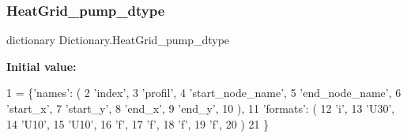 \mbox{\label{namespace_dictionary_a616d65efc5bb5f169c0fb9781b4292c2}} 
\subsubsection{\texorpdfstring{Heat\+Grid\+\_\+pump\+\_\+dtype}{HeatGrid\_pump\_dtype}}
{\footnotesize\ttfamily dictionary Dictionary.\+Heat\+Grid\+\_\+pump\+\_\+dtype}

{\bfseries Initial value\+:}
\begin{DoxyCode}
1 =     \{\textcolor{stringliteral}{'names'}: (
2                                 \textcolor{stringliteral}{'index'},
3                                 \textcolor{stringliteral}{'profil'},
4                                 \textcolor{stringliteral}{'start\_node\_name'},
5                                 \textcolor{stringliteral}{'end\_node\_name'},
6                                 \textcolor{stringliteral}{'start\_x'},
7                                 \textcolor{stringliteral}{'start\_y'},
8                                 \textcolor{stringliteral}{'end\_x'},
9                                 \textcolor{stringliteral}{'end\_y'},
10                                 ),
11                        \textcolor{stringliteral}{'formats'}: (
12                                 \textcolor{stringliteral}{'i'},
13                                 \textcolor{stringliteral}{'U30'},
14                                 \textcolor{stringliteral}{'U10'},
15                                 \textcolor{stringliteral}{'U10'},
16                                 \textcolor{stringliteral}{'f'},
17                                 \textcolor{stringliteral}{'f'},
18                                 \textcolor{stringliteral}{'f'},
19                                 \textcolor{stringliteral}{'f'},
20                                 )
21                                \}
\end{DoxyCode}
\mbox{\label{namespace_dictionary_a98301ff2458867192a5d80b8d59dfe94}} 
